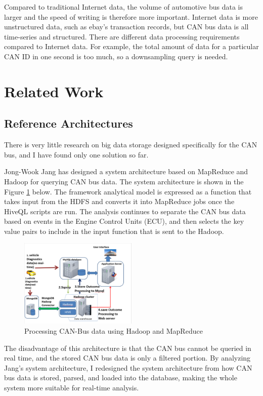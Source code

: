 Compared to traditional Internet data, the volume of automotive bus data is larger and the speed of writing is therefore more important. Internet data is more unstructured data, such as ebay's transaction records, but CAN bus data is all time-series and structured. There are different data processing requirements compared to Internet data. For example, the total amount of data for a particular CAN ID in one second is too much, so a downsampling query is needed.

\section{Related Work}

\subsection{Reference Architectures}
There is very little research on big data storage designed specifically for the CAN bus, and I have found only one solution so far.

Jong-Wook Jang\cite{7993938} has designed a system architecture based on MapReduce and Hadoop for querying CAN bus data. The system architecture is shown in the Figure \ref{fig:jong} below. The framework analytical model is expressed as a function that takes input from the HDFS and converts it into MapReduce jobs once the HiveQL scripts are run. The analysis continues to separate the CAN bus data based on events in the Engine Control Units (ECU), and then selects the key value pairs to include in the input function that is sent to the Hadoop\cite{7993938}.

\begin{figure}[hbt!]
    \centering
    \includegraphics[width=0.5\textwidth]{gfx/jong.png}
    \caption{Processing CAN-Bus data using Hadoop and MapReduce\cite{7993938}}
    \label{fig:jong}
\end{figure}

The disadvantage of this architecture is that the CAN bus cannot be queried in real time, and the stored CAN bus data is only a filtered portion. By analyzing Jang's system architecture, I redesigned the system architecture from how CAN bus data is stored, parsed, and loaded into the database, making the whole system more suitable for real-time analysis. 



